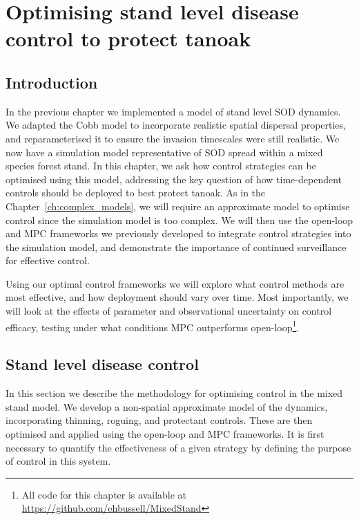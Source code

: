 %
\chapter{Optimising stand level disease control to protect tanoak\label{ch:protect_tanoak_control}}

\section{Introduction\label{sec:ch6:intro}}

In the previous chapter we implemented a model of stand level SOD dynamics. We adapted the Cobb model \citep{cobb_ecosystem_2012} to incorporate realistic spatial dispersal properties, and reparameterised it to ensure the invasion timescales were still realistic. We now have a simulation model representative of SOD spread within a mixed species forest stand. In this chapter, we ask how control strategies can be optimised using this model, addressing the key question of how time-dependent controls should be deployed to best protect tanoak. As in the Chapter~\ref{ch:complex_models}, we will require an approximate model to optimise control since the simulation model is too complex. We will then use the open-loop and MPC frameworks we previously developed to integrate control strategies into the simulation model, and demonstrate the importance of continued surveillance for effective control.

Using our optimal control frameworks we will explore what control methods are most effective, and how deployment should vary over time. Most importantly, we will look at the effects of parameter and observational uncertainty on control efficacy, testing under what conditions MPC outperforms open-loop\footnote{All code for this chapter is available at \url{https://github.com/ehbussell/MixedStand}}.

\section{Stand level disease control\label{sec:ch6:control}}

In this section we describe the methodology for optimising control in the mixed stand model. We develop a non-spatial approximate model of the dynamics, incorporating thinning, roguing, and protectant controls. These are then optimised and applied using the open-loop and MPC frameworks. It is first necessary to quantify the effectiveness of a given strategy by defining the purpose of control in this system.

